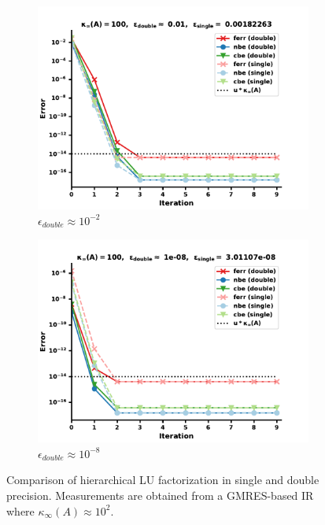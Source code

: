 \begin{figure}
\centering
\begin{subfigure}{.5\textwidth}
  \centering
  \includegraphics[width=\linewidth]{chapters/5_experiments/figures/GMRES512_e0_0s.pdf}
  \caption{$\epsilon_{double} \approx 10^{-2}$}
  \label{fig:lrirsg1_1}
\end{subfigure}%
\begin{subfigure}{.5\textwidth}
  \centering
  \includegraphics[width=\linewidth]{chapters/5_experiments/figures/GMRES512_e0_1s.pdf}
  \caption{$\epsilon_{double} \approx 10^{-8}$}
  \label{fig:lrirsg1_2}
\end{subfigure}
\caption[Mixed Precision Low-Rank GMRES-IR 1]{Comparison of hierarchical LU factorization in single and double precision. Measurements are obtained from a GMRES-based IR where $\kappa_\infty(A) \approx 10^2$.}
\label{fig:lrirsg1}
\end{figure}

